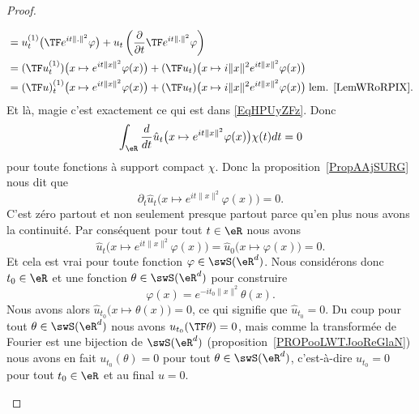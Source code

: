 \begin{proof}
\begin{subproof}
\begin{subequations}
\begin{align}
				                                                              & =u_t^{(1)}\big( \TF  e^{it\| . \|^2}\varphi \big)+u_t\left( \frac{ \partial  }{ \partial t }\TF e^{it\| . \|^2}\varphi \right)                                    \\
				                                                              & =(\TF u_t^{(1)})\big( x\mapsto  e^{it\| x \|^2}\varphi(x) \big)+(\TF u_t)\big( x\mapsto i\| x \|^2 e^{it\| x \|^2}\varphi(x) \big)                                \\
				                                                              & =(\TF u)_t^{(1)}\big( x\mapsto  e^{it\| x \|^2}\varphi(x) \big)+(\TF u_t)\big( x\mapsto i\| x \|^2 e^{it\| x \|^2}\varphi(x) \big)\;	\text{lem. \ref{LemWRoRPIX}.}
			\end{align}
		\end{subequations}
		Et là, magie c'est exactement ce qui est dans \eqref{EqHPUyZFz}. Donc
		\begin{equation}
			\int_{\eR}\frac{ d }{ dt }\hat u_t\big( x\mapsto  e^{it\| x \|^2}\varphi(x) \big)\chi(t)dt=0
		\end{equation}
		pour toute fonctions à support compact \( \chi\). Donc la proposition~\ref{PropAAjSURG} nous dit que
		\begin{equation}
			\partial_t\hat u_t\big( x\mapsto e^{it\| x \|^2}\varphi(x) \big)=0.
		\end{equation}
		C'est zéro partout et non seulement presque partout parce qu'en plus nous avons la continuité. Par conséquent pour tout \( t\in \eR\) nous avons
		\begin{equation}
			\hat u_t\big( x\mapsto e^{it\| x \|^2}\varphi(x) \big)=\hat u_0\big( x\mapsto \varphi(x)\big)=0.
		\end{equation}
		Et cela est vrai pour toute fonction \( \varphi\in\swS(\eR^d)\). Nous considérons donc \( t_0\in \eR\) et une fonction \( \theta\in\swS(\eR^d)\) pour construire
		\begin{equation}
			\varphi(x)= e^{-it_0\| x \|^2}\theta(x).
		\end{equation}
		Nous avons alors \( \hat u_{t_0}\big( x\mapsto\theta(x) \big)=0\), ce qui signifie que \( \hat u_{t_0}=0\). Du coup pour tout \( \theta\in\swS(\eR^d)\) nous avons \( u_{t_0}(\TF\theta)=0\), mais comme la transformée de Fourier est une bijection de \( \swS(\eR^d)\) (proposition~\ref{PROPooLWTJooReGlaN}) nous avons en fait \( u_{t_0}(\theta)=0\) pour tout \( \theta\in\swS(\eR^d)\), c'est-à-dire \( u_{t_0}=0\) pour tout \( t_0\in \eR\) et au final \( u=0\).
	\end{subproof}
\end{proof}

